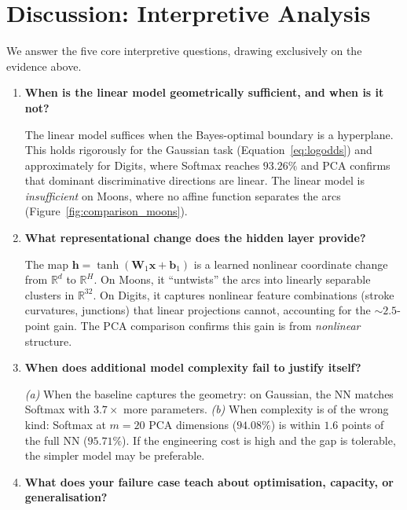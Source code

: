 \documentclass[11pt]{article}
\newcommand{\R}{\mathbb{R}}
\newcommand{\bx}{\mathbf{x}}
\newcommand{\bW}{\mathbf{W}}
\newcommand{\bb}{\mathbf{b}}
\newcommand{\bh}{\mathbf{h}}
\begin{document}
\section{Discussion: Interpretive Analysis}
\label{sec:discussion}

We answer the five core interpretive questions, drawing exclusively on the evidence above.

\begin{enumerate}[leftmargin=2em,itemsep=0.5em]

\item \textbf{When is the linear model geometrically sufficient, and when is it not?}

The linear model suffices when the Bayes-optimal boundary is a hyperplane.  This holds
rigorously for the Gaussian task (Equation~\ref{eq:logodds}) and approximately for Digits,
where Softmax reaches $93.26\%$ and PCA confirms that dominant discriminative directions
are linear.  The linear model is \emph{insufficient} on Moons, where no affine function
separates the arcs (Figure~\ref{fig:comparison_moons}).

\item \textbf{What representational change does the hidden layer provide?}

The map $\bh = \tanh(\bW_1\bx+\bb_1)$ is a learned nonlinear coordinate change from
$\R^d$ to $\R^H$.  On Moons, it ``untwists'' the arcs into linearly separable clusters
in $\R^{32}$.  On Digits, it captures nonlinear feature combinations (stroke curvatures,
junctions) that linear projections cannot, accounting for the ${\sim}2.5$-point gain.  The
PCA comparison confirms this gain is from \emph{nonlinear} structure.

\item \textbf{When does additional model complexity fail to justify itself?}

\emph{(a)} When the baseline captures the geometry: on Gaussian, the NN matches Softmax
with $3.7{\times}$ more parameters.  \emph{(b)} When complexity is of the wrong kind:
Softmax at $m{=}20$ PCA dimensions ($94.08\%$) is within $1.6$ points of the full NN
($95.71\%$).  If the engineering cost is high and the gap is tolerable, the simpler model
may be preferable.

\item \textbf{What does your failure case teach about optimisation, capacity, or
generalisation?}


\end{enumerate}
\end{document}
